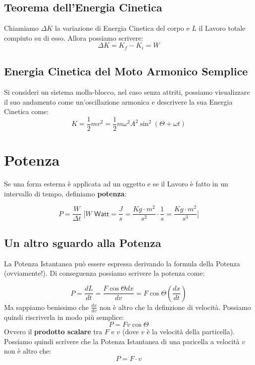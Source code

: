         \subsection{Teorema dell'Energia Cinetica} Chiamiamo $\Delta K$ la 
        variazione di Energia Cinetica del corpo e $L$ il Lavoro totale 
        compiuto su di esso. Allora possiamo scrivere:
        \begin{equation}
            \Delta K = K_f - K_i = W
        \end{equation}

        \subsection{Energia Cinetica del Moto Armonico Semplice} Si consideri un
        sistema molla-blocco, nel caso senza attriti, possiamo visualizzare il 
        suo andamento come un'oscillazione armonica e descrivere la sua Energia
        Cinetica come:
        \begin{equation}
            K = \frac{1}{2}mv^2 = \frac{1}{2}m\omega^2A^2\sin^2
            (\Theta + \omega t)
        \end{equation}

    
    \section{Potenza} Se una forza esterna è applicata ad un oggetto e se il 
    Lavoro è fatto in un intervallo di tempo, definiamo \textbf{potenza}:
        
        \begin{equation}
            P = \frac{W}{\Delta t} \; \Bigg[W \textsf{  Watt} = \frac{J}{s} 
            = \frac{Kg \cdot m^2}{s^2} \cdot \frac{1}{s} 
            = \frac{Kg \cdot m^2}{s^3} \Bigg]
        \end{equation}

        \subsection{Un altro sguardo alla Potenza} La Potenza Istantanea può 
        essere espressa derivando la formula della Potenza (ovviamente!). Di 
        conseguenza possiamo scrivere la potenza come:

        \begin{equation*}
            P = \frac{dL}{dt} = \frac{F \cos \Theta dx}{dv} 
            = F \cos \Theta (\frac{dx}{dt})
        \end{equation*}
        Ma sappiamo benissimo che $\frac{dx}{dv}$ non è altro che la definzione 
        di velocità. Possiamo quindi riscriverla in modo più semplice:
        \begin{equation*}
            P = Fv\cos\Theta
        \end{equation*}
        Ovvero il \textbf{prodotto scalare} tra $F$ e $v$ (dove $v$ è la 
        velocità della particella). Possiamo quindi scrivere che la Potenza 
        Istantanea di una paricella a velocità $v$ non è altro che:
        \begin{equation}
            P = F \cdot v
        \end{equation}

